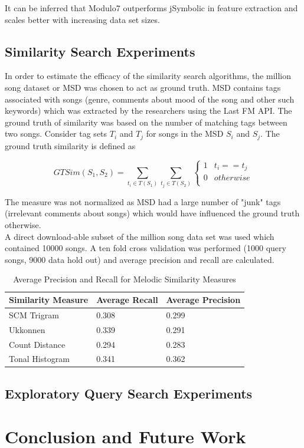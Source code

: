 \documentclass{article}
\begin{document}
\noindent It can be inferred that Modulo7 outperforms jSymbolic in feature extraction and scales better with increasing data set sizes. 

\subsection{Similarity Search Experiments}

\noindent In order to estimate the efficacy of the similarity search algorithms, the million song dataset or MSD \cite{msd} was chosen to act as ground truth. MSD contains tags associated with songs (genre, comments about mood of the song and other such keywords) which was extracted by the researchers using the Last FM API. The ground truth of similarity was based on the number of matching tags between two songs. Consider tag sets $T_i$ and $T_j$ for songs in the MSD $S_i$ and $S_j$. The ground truth similarity is defined as 

\begin{equation} \label{taghitrate}
GTSim(S_1, S_2) = \sum_{t_i \in T(S_1)} \sum_{t_j \in T(S_2)} \begin{cases} 
      1 & t_i == t_j \\
      0 & otherwise \\  \end{cases}
\end{equation}

\noindent The measure was not normalized as MSD had a large number of "junk" tags (irrelevant comments about songs) which would have influenced the ground truth otherwise. \\

\noindent A direct download-able subset of the million song data set was used which contained 10000 songs. A ten fold cross validation was performed (1000 query songs, 9000 data hold out) and average precision and recall are calculated. 

\begin{table}[h]
\begin{center}
    \begin{tabular}{| l | l | l |}
    \hline
    Similarity Measure & Average Recall & Average Precision \\ \hline
    SCM Trigram & 0.308 & 0.299 \\ \hline
    Ukkonnen & 0.339 & 0.291 \\ \hline
    Count Distance & 0.294 & 0.283  \\ \hline
    Tonal Histogram & 0.341 & 0.362  \\ \hline
    \end{tabular}
\end{center}
\caption{Average Precision and Recall for Melodic Similarity Measures}
\end{table}


\subsection{Exploratory Query Search Experiments}





\section{Conclusion and Future Work}



\end{document}
